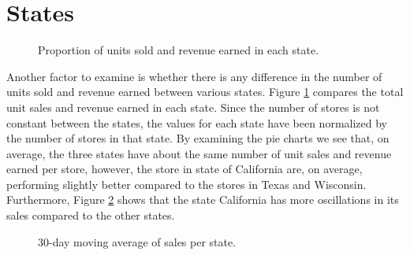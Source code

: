 \section{States}
\begin{figure}
    \vspace{-10pt}
    \centering
    \captionsetup{width=0.52\textwidth}
    \caption{Proportion of units sold and revenue earned in each state.}
    \label{fig:sales_rev_states}
    \vspace{-20pt}
\end{figure}
Another factor to examine is whether there is any difference in the number of units sold and revenue earned between various states.
Figure \ref{fig:sales_rev_states} compares the total unit sales and revenue earned in each state. 
Since the number of stores is not constant between the states, the values for each state have been normalized by the number of stores in that state.
By examining the pie charts we see that, on average, the three states have about the same number of unit sales and revenue earned per store, however, the store in state of California are, on average, performing slightly better compared to the stores in Texas and Wisconsin. 
Furthermore, Figure \ref{fig:state_sales} shows that the state California has more oscillations in its sales compared to the other states.

\begin{figure}[b!]
    \centering
    \captionsetup{width=0.98\textwidth}
    \caption{30-day moving average of sales per state.}
    \label{fig:state_sales}
\end{figure} 



